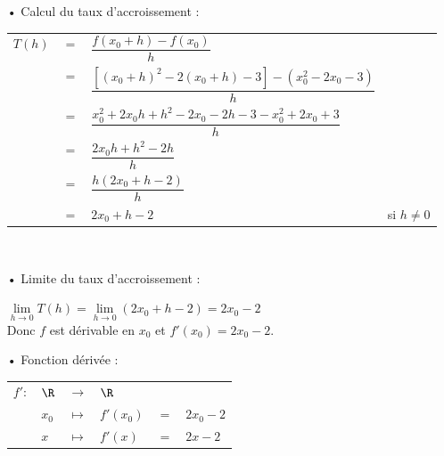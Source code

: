 \begin{itemize}
\item[•] Calcul du taux d'accroissement : \vspace*{.3cm}
\\
\begin{tabular}{llll}
$T(h)$ & $=$ & $\dfrac{f(x_0 + h) - f(x_0)}{h}$ & \vspace*{.3cm} \\
& $=$ & $\dfrac{\left[\left(x_0 + h\right)^2 -2\left(x_0 + h\right) - 3\right] - \left(x_0^2 - 2x_0 - 3\right)}{h}$ & \vspace*{.3cm} \\
& $=$ & $\dfrac{x_0^2 + 2x_0h + h^2 -2x_0 - 2h -3 -x_0^2 + 2x_0 + 3}{h}$ & \vspace*{.3cm} \\
& $=$ & $\dfrac{2x_0h + h^2 -2h}{h}$ & \vspace*{.3cm} \\
& $=$ & $\dfrac{h\left(2x_0 + h - 2\right)}{h}$ & \vspace*{.3cm} \\
& $=$ & $2x_0 + h - 2$ & si $h \neq 0$ \\
\end{tabular} \\
\vspace*{.3cm}

\item[•] Limite du taux d'accroissement : \vspace*{.3cm}

$\lim\limits_{h \to 0} T(h) = \lim\limits_{h \to 0} ( 2x_0 + h - 2) = 2x_0 - 2$ \vspace*{.3cm} \\

Donc $f$ est dérivable en $x_0$ et $f'(x_0) = 2x_0 - 2$. \\

\item[•] Fonction dérivée : \\

\begin{tabular}{llllll}
$f' :$ & $\R$ & $\longrightarrow$ & $\R$ & & \\
& $x_0$ & $\longmapsto$ & $f'(x_0)$ & $ = $ & $2x_0 - 2$ \\
& $x$ & $\longmapsto$ & $f'(x)$ & $ = $ & $2x - 2$ \\
\end{tabular}
\end{itemize}

\vspace*{.3cm}

